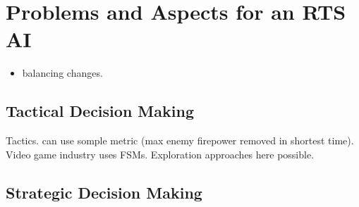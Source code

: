\section{Problems and Aspects for an RTS AI}
\begin{itemize}[noitemsep,nolistsep]
    \item balancing changes.
\end{itemize}
\subsection{Tactical Decision Making}
Tactics. can use somple metric (max enemy firepower removed in shortest time). Video game industry uses FSMs. Exploration approaches here possible.
\subsection{Strategic Decision Making}
